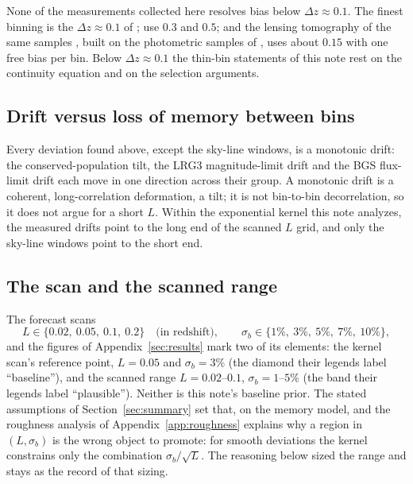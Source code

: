 \documentclass[11pt]{article}
\begin{document}
None of the measurements collected here resolves bias below
$\Delta z \approx 0.1$.  The
finest binning is the $\Delta z \approx 0.1$ of \cite{Zhou2021};
\cite{Rocher2023} use $0.3$ and $0.5$; and the lensing tomography of
the same samples \cite{White2022, Sailer2024, Sailer2025}, built on
the photometric samples of \cite{Zhou2023tomo}, uses about $0.15$
with one free bias per bin.  Below $\Delta z \approx 0.1$ the
thin-bin statements of this note rest on the continuity equation and
on the selection arguments.

\subsection{Drift versus loss of memory between bins}
\label{sec:drift}

Every deviation found above, except the sky-line windows, is a
monotonic drift: the conserved-population tilt, the LRG3
magnitude-limit drift and the BGS flux-limit drift each move in one
direction across their group.  A monotonic drift is a coherent,
long-correlation deformation, a tilt; it is not bin-to-bin
decorrelation, so it does not argue for a short $L$.  Within the
exponential kernel this note analyzes, the measured drifts point to
the long end of the scanned $L$ grid, and only the sky-line windows
point to the short end.

\subsection{The scan and the scanned range}
\label{sec:scan}

The forecast scans
\begin{equation}
  L \in \{0.02,\ 0.05,\ 0.1,\ 0.2\}
  \quad\text{(in redshift)},
  \qquad
  \sigma_b \in \{1\%,\ 3\%,\ 5\%,\ 7\%,\ 10\%\},
  \label{eq:scan}
\end{equation}
and the figures of Appendix~\ref{sec:results} mark two of its
elements: the kernel scan's reference point, $L = 0.05$ and
$\sigma_b = 3\%$ (the diamond their legends label ``baseline''), and
the scanned range $L = 0.02$--$0.1$, $\sigma_b = 1$--$5\%$ (the band
their legends label ``plausible'').  Neither is this note's baseline
prior.
The stated assumptions of Section~\ref{sec:summary} set that, on the
memory model, and the roughness analysis of
Appendix~\ref{app:roughness} explains why a region in
$(L, \sigma_b)$ is the wrong object to promote: for smooth deviations
the kernel constrains only the combination $\sigma_b/\sqrt{L}$.  The
reasoning below sized the range and stays as the record of that
sizing.
\end{document}

